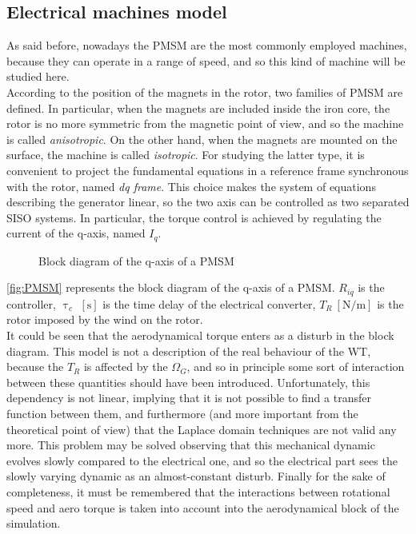 \subsection{Electrical machines model}
As said before, nowadays the \acrfull{PMSM} are the most commonly employed machines, because they can operate in a range of speed, and so this kind of machine will be studied here.\\
According to the position of the magnets in the rotor, two families of \acrshort{PMSM} are defined. In particular, when the magnets are included inside the iron core, the rotor is no more symmetric from the magnetic point of view, and so the machine is called \textit{anisotropic}. On the other hand, when the magnets are mounted on the surface, the machine is called \textit{isotropic}. For studying the latter type, it is convenient to project the fundamental equations in a reference frame synchronous with the rotor, named \textit{dq frame}. This choice makes the system of equations describing the generator linear, so the two axis can be controlled as two separated \acrfull{SISO} systems. In particular, the torque control is achieved by regulating the current of the q-axis, named $I_q$.
\begin{figure}[htb]

\caption{Block diagram of the q-axis of a PMSM}
\label{fig:PMSM}
\end{figure}

\autoref{fig:PMSM} represents the block diagram of the q-axis of a \acrshort{PMSM}. $R_{iq}$ is the controller, $\uptau_{c}$ $\left[\si{\second}\right]$ is the time delay of the electrical converter, $T_R \ \left[\si{\newton \per \meter}\right]$ is the rotor imposed by the wind on the rotor.\\
It could be seen that the aerodynamical torque enters as a disturb in the block diagram. This model is not a description of the real behaviour of the \acrshort{WT}, because the $T_R$ is affected by the $\Omega_G$, and so in principle some sort of interaction between these quantities should have been introduced. Unfortunately, this dependency is not linear, implying that it is not possible to find a transfer function between them, and furthermore (and more important from the theoretical point of view) that the Laplace domain techniques are not valid any more. This problem may be solved observing that this mechanical dynamic evolves slowly compared to the electrical one, and so the electrical part sees the slowly varying dynamic as an almost-constant disturb. Finally for the sake of completeness, it must be remembered that the interactions between rotational speed and aero torque is taken into account into the aerodynamical block of the simulation.

